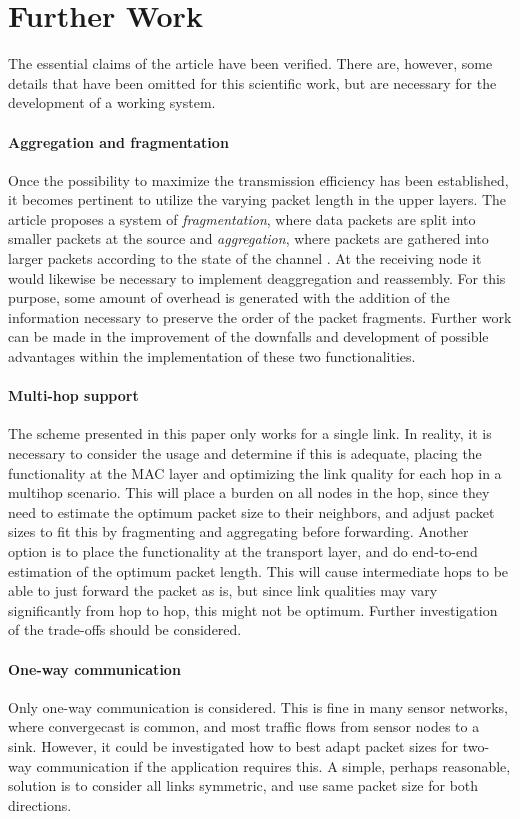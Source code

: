 \section{Further Work\label{sec:FW}}
The essential claims of the article \cite{DPLCpaper} have been verified. There are, however, some details that have been omitted for this scientific work, but are necessary for the development of a working system.
\paragraph{Aggregation and fragmentation} Once the possibility to maximize the transmission efficiency has been established, it becomes pertinent to utilize the varying packet length in the upper layers. The article proposes a system of \emph{fragmentation}, where data packets are split into smaller packets at the source and \emph{aggregation}, where packets are gathered into larger packets according to the state of the channel \cite{DPLCpaper}. At the receiving node it would likewise be necessary to implement deaggregation and reassembly. For this purpose, some amount of overhead is generated with the addition of the information necessary to preserve the order of the packet fragments. Further work can be made in the improvement of the downfalls and development of possible advantages within the implementation of these two functionalities.
\paragraph{Multi-hop support} The scheme presented in this paper only works for a single link. In reality, it is necessary to consider the usage and determine if this is adequate, placing the functionality at the MAC layer and optimizing the link quality for each hop in a multihop scenario. This will place a burden on all nodes in the hop, since they need to estimate the optimum packet size to their neighbors, and adjust packet sizes to fit this by fragmenting and aggregating before forwarding. Another option is to place the functionality at the transport layer, and do end-to-end estimation of the optimum packet length. This will cause intermediate hops to be able to just forward the packet as is, but since link qualities may vary significantly from hop to hop, this might not be optimum. Further investigation of the trade-offs should be considered.
\paragraph{One-way communication} Only one-way communication is considered. This is fine in many sensor networks, where convergecast is common, and most traffic flows from sensor nodes to a sink. However, it could be investigated how to best adapt packet sizes for two-way communication if the application requires this. A simple, perhaps reasonable, solution is to consider all links symmetric, and use same packet size for both directions.
